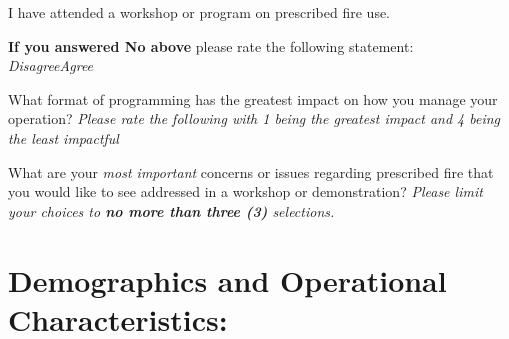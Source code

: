 \documentclass[
  english,
  ]{sdapsclassic}
\begin{document}
\begin{questionnaire}
    
    \begin{choicequestion}[cols=3]{I have attended a workshop or program on prescribed fire use.}
    \end{choicequestion}    
   
     \begin{markgroup}{\textbf{If you answered No above} please rate the following statement:}
 	{\emph{Disagree}}{\emph{Agree}~~}~{}~{}
      \end{markgroup}

    
    \begin{choicequestion}[cols=2]{What format of programming has the greatest impact on how you manage your operation? \emph{Please rate the following with 1 being the greatest impact and 4 being the least impactful} }
    \end{choicequestion}
    
    \begin{choicequestion}[cols=2]{What are your \emph{most important} concerns or issues regarding prescribed fire that you would like to see addressed in a workshop or demonstration? \emph{Please limit your choices to \textbf{no more than three (3)} selections.}}
    \end{choicequestion}  

\vspace{5em}
  
    \section{Demographics and Operational Characteristics:}
    

\end{questionnaire}
\end{document}

